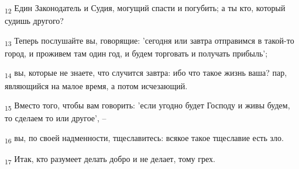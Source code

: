 \begin{tcolorbox}
\textsubscript{12} Един Законодатель и Судия, могущий спасти и погубить; а ты кто, который судишь другого?
\end{tcolorbox}
\begin{tcolorbox}
\textsubscript{13} Теперь послушайте вы, говорящие: 'сегодня или завтра отправимся в такой-то город, и проживем там один год, и будем торговать и получать прибыль';
\end{tcolorbox}
\begin{tcolorbox}
\textsubscript{14} вы, которые не знаете, что случится завтра: ибо что такое жизнь ваша? пар, являющийся на малое время, а потом исчезающий.
\end{tcolorbox}
\begin{tcolorbox}
\textsubscript{15} Вместо того, чтобы вам говорить: 'если угодно будет Господу и живы будем, то сделаем то или другое', --
\end{tcolorbox}
\begin{tcolorbox}
\textsubscript{16} вы, по своей надменности, тщеславитесь: всякое такое тщеславие есть зло.
\end{tcolorbox}
\begin{tcolorbox}
\textsubscript{17} Итак, кто разумеет делать добро и не делает, тому грех.
\end{tcolorbox}
